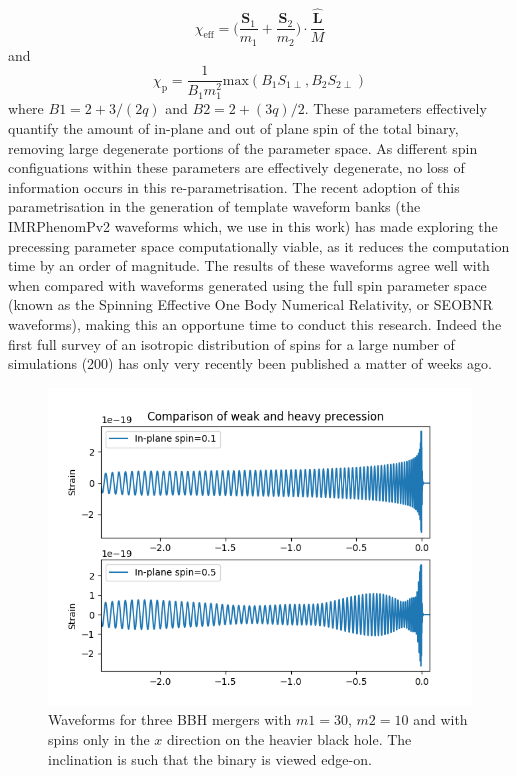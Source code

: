 \documentclass[]{article}
\begin{document}
\begin{equation}
\chi_{\text{eff}}=\bigg(\frac{\mathbf{S}_1}{m_1}+\frac{\mathbf{S}_2}{m_2}\bigg)\cdot\frac{\mathbf{\hat{L}}}{M}
\end{equation}
and
\begin{equation}
\chi_\text{p}=\frac{1}{B_1m^2_1}\text{max}(B_1S_{1\perp},B_2S_{2\perp})
\end{equation}
where $B1=2+3/(2q)$ and $B2=2+(3q)/2$. These parameters effectively quantify the amount of in-plane and out of plane spin of the total binary, removing large degenerate portions of the parameter space. As different spin configuations within these parameters are effectively degenerate, no loss of information occurs in this re-parametrisation. The recent adoption of this parametrisation in the generation of template waveform banks (the IMRPhenomPv2 waveforms which, we use in this work) has made exploring the precessing parameter space computationally viable, as it reduces the computation time by an order of magnitude. The results of these waveforms agree well with when compared with waveforms generated using the full spin parameter space (known as the Spinning Effective One Body Numerical Relativity, or SEOBNR waveforms)\cite{spin}, making this an opportune time to conduct this research. Indeed the first full survey of an isotropic distribution of spins for a large number of simulations (200) has only very recently been published a matter of weeks ago\cite{pe_latest}.
\begin{figure}[h]
	\includegraphics[scale=1]{fig7.png}
	\centering
	\caption{Waveforms for three BBH mergers with $m1=30$, $m2=10$ and with spins only in the $x$ direction on the heavier black hole. The inclination is such that the binary is viewed edge-on.}
	\centering
\end{figure}
\end{document}
